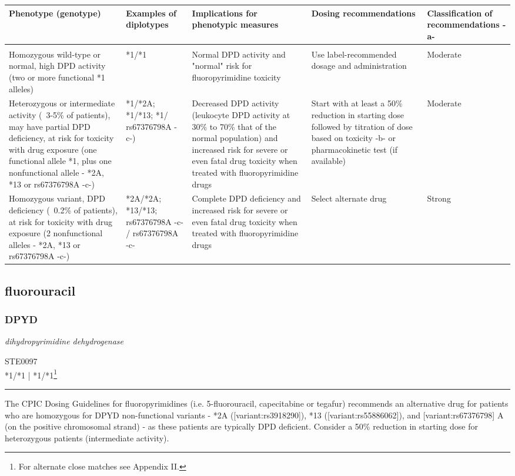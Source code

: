 \documentclass{report}
\begin{document}
      \begin{tabularx}{\textwidth}{ XXXXX }
      \textbf{ Phenotype (genotype) }&\textbf{ Examples of diplotypes }&\textbf{ Implications for phenotypic measures }&\textbf{ Dosing recommendations }&\textbf{ Classification of recommendations -a- } \\ \hline \\  Homozygous wild-type or normal, high DPD activity (two or more functional *1 alleles) & *1/*1 & Normal DPD activity and "normal" risk for fluoropyrimidine toxicity & Use label-recommended dosage and administration & Moderate  \\  Heterozygous or intermediate activity (~3-5\% of patients), may have partial DPD deficiency, at risk for toxicity with drug exposure (one functional allele *1, plus one nonfunctional allele - *2A, *13 or rs67376798A -c-) & *1/*2A; *1/*13; *1/ rs67376798A -c-) & Decreased DPD activity (leukocyte DPD activity at 30\% to 70\% that of the normal population) and increased risk for severe or even fatal drug toxicity when treated with fluoropyrimidine drugs & Start with at least a 50\% reduction in starting dose followed by titration of dose based on toxicity -b- or pharmacokinetic test (if available) & Moderate  \\  Homozygous variant, DPD deficiency (~0.2\% of patients), at risk for toxicity with drug exposure (2 nonfunctional alleles - *2A, *13 or rs67376798A -c-) & *2A/*2A; *13/*13; rs67376798A -c- / rs67376798A -c- & Complete DPD deficiency and increased risk for severe or even fatal drug toxicity when treated with fluoropyrimidine drugs & Select alternate drug & Strong  \\ 
      \end{tabularx}
      
      \normalsize



\subsection{ fluorouracil }

\subsubsection{ DPYD }
     \textit{ dihydropyrimidine dehydrogenase } \begin{flushright} \textsc{ STE0097 \\ *1/*1  | *1/*1\footnote{For alternate close matches see Appendix II.} }\end{flushright}
      \hrule \vspace{6pt}
      The CPIC Dosing Guidelines for fluoropyrimidines (i.e. 5-fluorouracil, capecitabine or tegafur) recommends an alternative drug for patients who are homozygous for DPYD non-functional variants - *2A ([variant:rs3918290]), *13 ([variant:rs55886062]), and [variant:rs67376798] A (on the positive chromosomal strand) - as these patients are typically DPD deficient.  Consider a 50\% reduction in starting dose for heterozygous patients (intermediate activity). \newline
      \scriptsize
      
\end{document}
